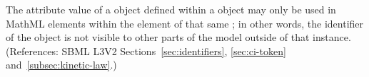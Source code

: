 The  attribute value of a \LocalParameter object defined within a
\KineticLaw object may only be used in MathML  elements within
the  element of that same \KineticLaw; in other words, the
identifier of the \LocalParameter object is not visible to other parts of
the model outside of that \KineticLaw instance.  (References: SBML L3V2
Sections~\ref{sec:identifiers}, \ref{sec:ci-token}
and~\ref{subsec:kinetic-law}.)
